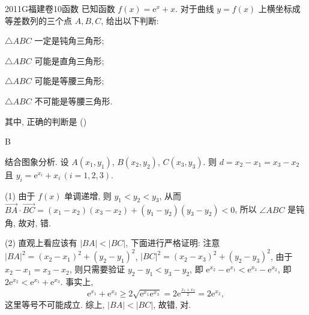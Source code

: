
\begin{problem}{2011}{G}{福建卷}{10}{函数}
已知函数 $ f(x)=\mathrm{e}^x+x $. 对于曲线 $ y=f(x) $ 上横坐标成等差数列的三个点 $ A,B,C $, 给出以下判断:
  
 $ \triangle ABC $ 一定是钝角三角形;  

 $ \triangle ABC $ 可能是直角三角形;  

 $ \triangle ABC $ 可能是等腰三角形;  

 $ \triangle ABC $ 不可能是等腰三角形.  

其中, 正确的判断是 (\hspace{1cm})
\begin{choices}
\end{choices}
\end{problem}

\begin{answer}
B
\end{answer}

\begin{solutions}

结合图象分析. 设 $ A(x_1,y_1) $, $ B(x_2,y_2) $, $ C(x_3,y_3) $. 则 $ d=x_2-x_1=x_3-x_2 $ 且 $ y_i=\mathrm{e}^{x_i}+x_i\,(i=1,2,3) $.  

(1) 由于 $ f(x) $ 单调递增, 则 $ y_1<y_2<y_3 $, 从而 $ \overrightarrow{BA}\cdot\overrightarrow{BC}=(x_1-x_2)(x_3-x_2)+(y_1-y_2)(y_3-y_2)<0 $, 所以 $ \angle ABC $ 是钝角, 故对, 错.  

(2) 直观上看应该有 $ |BA|<|BC| $, 下面进行严格证明: 注意 $ |BA|^2=(x_2-x_1)^2+(y_2-y_1)^2 $, $ |BC|^2=(x_2-x_3)^2+(y_2-y_3)^2 $, 由于 $ x_2-x_1=x_3-x_2 $, 则只需要验证 $ y_2-y_1<y_3-y_2 $, 即 $ \mathrm{e}^{x_2}-\mathrm{e}^{x_1}<\mathrm{e}^{x_3}-\mathrm{e}^{x_2} $, 即 $ 2\mathrm{e}^{x_2}<\mathrm{e}^{x_1}+\mathrm{e}^{x_3} $. 事实上,  
$$
\mathrm{e}^{x_1}+\mathrm{e}^{x_3}\geq 2\sqrt{\mathrm{e}^{x_1}\mathrm{e}^{x_3}}=2\mathrm{e}^{\frac{x_1+x_3}{2}}=2\mathrm{e}^{x_2},
$$  
这里等号不可能成立. 综上, $ |BA|<|BC| $, 故错, 对.
\end{solutions}
